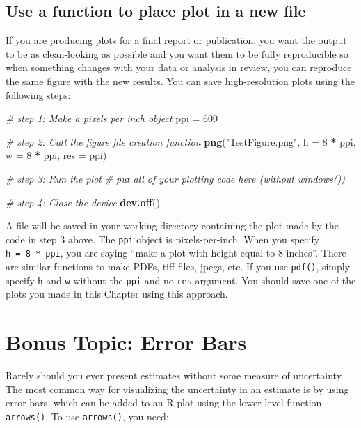 \documentclass[]{book}
\newenvironment{Shaded}{\begin{snugshade}}{\end{snugshade}}
\newcommand{\CommentTok}[1]{\textcolor[rgb]{0.56,0.35,0.01}{\textit{#1}}}
\newcommand{\DataTypeTok}[1]{\textcolor[rgb]{0.13,0.29,0.53}{#1}}
\newcommand{\DecValTok}[1]{\textcolor[rgb]{0.00,0.00,0.81}{#1}}
\newcommand{\KeywordTok}[1]{\textcolor[rgb]{0.13,0.29,0.53}{\textbf{#1}}}
\newcommand{\NormalTok}[1]{#1}
\newcommand{\OperatorTok}[1]{\textcolor[rgb]{0.81,0.36,0.00}{\textbf{#1}}}
\newcommand{\StringTok}[1]{\textcolor[rgb]{0.31,0.60,0.02}{#1}}
\begin{document}
\hypertarget{file-devices}{%
\subsection{Use a function to place plot in a new file}\label{file-devices}}

If you are producing plots for a final report or publication, you want the output to be as clean-looking as possible and you want them to be fully reproducible so when something changes with your data or analysis in review, you can reproduce the same figure with the new results. You can save high-resolution plots using the following steps:

\begin{Shaded}
\begin{Highlighting}[]
\CommentTok{# step 1: Make a pixels per inch object}
\NormalTok{ppi =}\StringTok{ }\DecValTok{600}

\CommentTok{# step 2: Call the figure file creation function}
\KeywordTok{png}\NormalTok{(}\StringTok{"TestFigure.png"}\NormalTok{, }\DataTypeTok{h =} \DecValTok{8} \OperatorTok{*}\StringTok{ }\NormalTok{ppi, }\DataTypeTok{w =} \DecValTok{8} \OperatorTok{*}\StringTok{ }\NormalTok{ppi, }\DataTypeTok{res =}\NormalTok{ ppi)}

\CommentTok{# step 3: Run the plot }
\CommentTok{# put all of your plotting code here (without windows())}

\CommentTok{# step 4: Close the device}
\KeywordTok{dev.off}\NormalTok{()}
\end{Highlighting}
\end{Shaded}

A file will be saved in your working directory containing the plot made by the code in step 3 above. The \texttt{ppi} object is pixels-per-inch. When you specify \texttt{h\ =\ 8\ *\ ppi}, you are saying ``make a plot with height equal to 8 inches''. There are similar functions to make PDFs, tiff files, jpegs, etc. If you use \texttt{pdf()}, simply specify \texttt{h} and \texttt{w} without the \texttt{ppi} and no \texttt{res} argument. You should save one of the plots you made in this Chapter using this approach.

\hypertarget{error-bars}{%
\section{Bonus Topic: Error Bars}\label{error-bars}}

Rarely should you ever present estimates without some measure of uncertainty. The most common way for visualizing the uncertainty in an estimate is by using error bars, which can be added to an R plot using the lower-level function \texttt{arrows()}. To use \texttt{arrows()}, you need:
\end{document}
